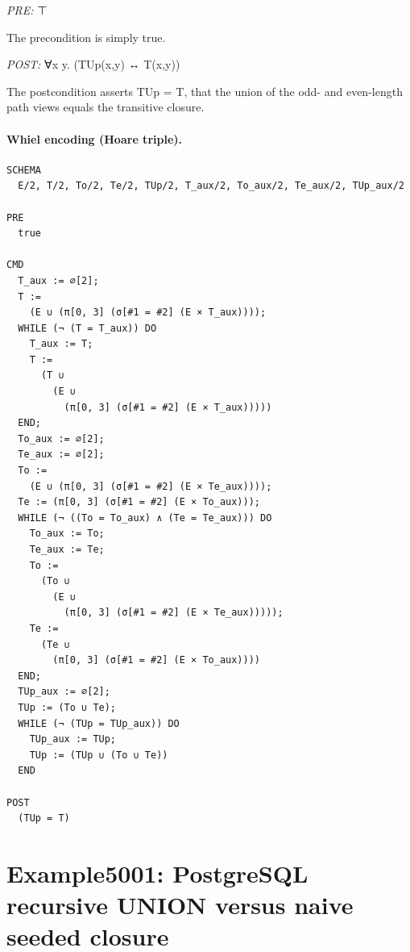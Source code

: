 \documentclass[10pt]{article}
\begin{document}
\textit{PRE:} ⊤\par The precondition is simply true.

\textit{POST:} ∀x y. (TUp(x,y) ↔ T(x,y))\par The postcondition asserts TUp = T, that the union of the odd- and even-length path views equals the transitive closure.

\paragraph{Whiel encoding (Hoare triple).}

\begin{Verbatim}[fontsize=\tiny,breaklines=true,breakanywhere=true,frame=single,framesep=1.5mm]
SCHEMA
  E/2, T/2, To/2, Te/2, TUp/2, T_aux/2, To_aux/2, Te_aux/2, TUp_aux/2

PRE
  true 

CMD
  T_aux := ∅[2];
  T :=
    (E ∪ (π[0, 3] (σ[#1 = #2] (E × T_aux))));
  WHILE (¬ (T = T_aux)) DO
    T_aux := T;
    T :=
      (T ∪
        (E ∪
          (π[0, 3] (σ[#1 = #2] (E × T_aux)))))
  END;
  To_aux := ∅[2];
  Te_aux := ∅[2];
  To :=
    (E ∪ (π[0, 3] (σ[#1 = #2] (E × Te_aux))));
  Te := (π[0, 3] (σ[#1 = #2] (E × To_aux)));
  WHILE (¬ ((To = To_aux) ∧ (Te = Te_aux))) DO
    To_aux := To;
    Te_aux := Te;
    To :=
      (To ∪
        (E ∪
          (π[0, 3] (σ[#1 = #2] (E × Te_aux)))));
    Te :=
      (Te ∪
        (π[0, 3] (σ[#1 = #2] (E × To_aux))))
  END;
  TUp_aux := ∅[2];
  TUp := (To ∪ Te);
  WHILE (¬ (TUp = TUp_aux)) DO
    TUp_aux := TUp;
    TUp := (TUp ∪ (To ∪ Te))
  END

POST
  (TUp = T)
\end{Verbatim}

\Needspace{0.45\textheight}

\section{Example5001: PostgreSQL recursive UNION versus naive seeded closure}\label{case:Example5001}
\end{document}
